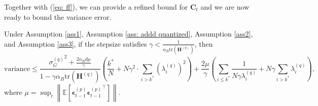 \documentclass[11pt, letterpaper]{article}
\begin{document}
Together with (\ref{eq: ff}), we can provide a refined bound for $\mathbf{C}_t$ and we are now ready to bound the variance error.

\begin{lemma}
    \label{variance R2 bound, master}
    Under Assumption \ref{ass1}, Assumption \ref{ass: addd quantized}, Assumption \ref{ass2}, and Assumption \ref{ass3}, if the stepsize satisfies $\gamma < \frac{1}{\alpha_B\mathrm{tr}(\mathbf{H}^{(q)})}$, then
    \begin{equation*}
        \mathrm{variance}\leq \frac{{\sigma_G^{(q)}}^2+\frac{2\alpha_Bd\mu}{\gamma}}{1-\gamma\alpha_B\mathrm{tr}(\mathbf{H}^{(q)})}\left(\frac{k^*}{N}+N\gamma^2\cdot\sum_{i>k^*}(\lambda_i^{(q)})^2\right)+\frac{2\mu}{\gamma}\left(\sum_{i\leq k^*}\frac{1}{N\gamma\lambda_i^{(q)}}+N\gamma\sum_{i>k^*}\lambda_i^{(q)}\right),
    \end{equation*}
    where $\mu=\sup_t\left\|\mathbb{E}\left[\boldsymbol{\epsilon}_{t-1}^{(p)}{\boldsymbol{\epsilon}_{t-1}^{(p)}}^\top\right]\right\|$.
\end{lemma}
\end{document}
